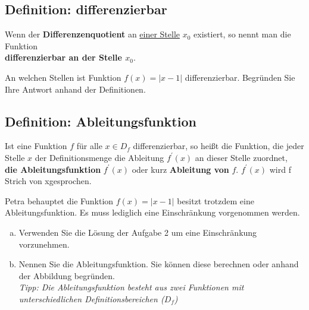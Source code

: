 		\subsection*{Definition: differenzierbar}
			\begin{tcolorbox}
				Wenn der \textbf{Differenzenquotient} an \underline{einer Stelle} $x_0$ existiert, so nennt man die Funktion\\
				
				\textbf{differenzierbar an der Stelle $x_0$}.
			\end{tcolorbox}
			 An welchen Stellen ist Funktion $f(x)=\left\vert x-1\right\vert$ differenzierbar. Begründen Sie Ihre Antwort anhand der Definitionen.\vspace{-0.3cm}
			\subsection*{Definition: Ableitungsfunktion}
			\begin{tcolorbox}
				Ist eine Funktion $f$ für alle $x\in D_f$ differenzierbar, so heißt die Funktion, die jeder Stelle $x$ der Definitionsmenge die Ableitung $f^\prime(x)$ an dieser Stelle zuordnet,\\
				
				\textbf{die Ableitungsfunktion} $f^\prime(x)$ oder kurz \textbf{Ableitung von} $f$.
				\tcblower
				  $f^\prime(x)$ wird \glqq f Strich von x\grqq gesprochen.  
			\end{tcolorbox}\vspace{-0.3cm}
			Petra behauptet die Funktion $f(x)=\left\vert x-1\right\vert$ besitzt trotzdem eine Ableitungsfunktion. Es muss lediglich eine Einschränkung vorgenommen werden.
			\begin{enumerate}[a)]
				\item Verwenden Sie die Lösung der Aufgabe 2 um eine Einschränkung vorzunehmen.
				\item Nennen Sie die Ableitungsfunktion. Sie können diese berechnen oder anhand der Abbildung begründen. \\

				\textit{Tipp: Die Ableitungsfunktion besteht aus zwei Funktionen mit unterschiedlichen Definitionsbereichen ($D_f$)}
			\end{enumerate}
			


